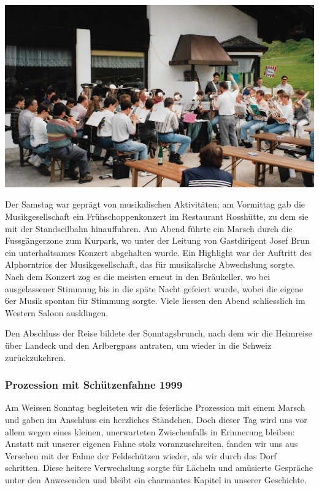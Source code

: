 \begin{history}
    \begin{MulticolFigure}
        \centering
        \includegraphics[width=0.93\linewidth]{./chap/1975-2000/1997/MGH-Ausflug-Seefeld-1997-1.jpg}
    \end{MulticolFigure}

    Der Samstag war geprägt von musikalischen Aktivitäten; am Vormittag gab die
    Musikgesellschaft ein Frühschoppenkonzert im Restaurant Rosshütte, zu dem
    sie mit der Standseilbahn hinauffuhren. Am Abend führte ein Marsch durch die
    Fussgängerzone zum Kurpark, wo unter der Leitung von Gastdirigent Josef Brun
    ein unterhaltsames Konzert abgehalten wurde. Ein Highlight war der Auftritt
    des Alphorntrios der Musikgesellschaft, das für musikalische Abwechslung
    sorgte. Nach dem Konzert zog es die meisten erneut in den Bräukeller, wo bei
    ausgelassener Stimmung bis in die späte Nacht gefeiert wurde, wobei die
    eigene 6er Musik spontan für Stimmung sorgte. Viele liessen den Abend
    schliesslich im Western Saloon ausklingen.


    Den Abschluss der Reise bildete der Sonntagsbrunch, nach dem wir die
    Heimreise über Landeck und den Arlbergpass antraten, um wieder in die
    Schweiz zurückzukehren.

    \subsubsection*{Prozession mit Schützenfahne 1999}
    Am Weissen Sonntag begleiteten wir die feierliche Prozession mit einem
    Marsch und gaben im Anschluss ein herzliches Ständchen. Doch dieser Tag wird
    uns vor allem wegen eines kleinen, unerwarteten Zwischenfalls in Erinnerung
    bleiben: Anstatt mit unserer eigenen Fahne stolz voranzuschreiten, fanden
    wir uns aus Versehen mit der Fahne der Feldschützen wieder, als wir durch
    das Dorf schritten. Diese heitere Verwechslung sorgte für Lächeln und
    amüsierte Gespräche unter den Anwesenden und bleibt ein charmantes Kapitel
    in unserer Geschichte.


\end{history}

